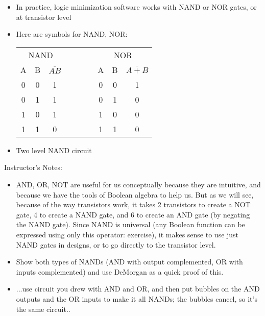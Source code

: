 \begin{frame}[fragile]
  \begin{itemize}
  \item In practice, logic minimization software works with
	NAND or NOR gates, or at transistor level

  \item Here are symbols for NAND, NOR:

	\begin{center}
	\begin{tabular}{|c|c|c|c|c|c|c|}\cline{1-3}\cline{5-7}
	\multicolumn{3}{|c|}{NAND}& &\multicolumn{3}{|c|}{NOR} \\\cline{1-3}\cline{5-7}
	A & B & \Large$\overline{AB}$ &~~~~~ & A & B & \Large$\overline{A+B}$  \\\cline{1-3}\cline{5-7}
	0 & 0 & 1   & & 0 & 0 & 1   \\\cline{1-3}\cline{5-7}
	0 & 1 & 1   & & 0 & 1 & 0   \\\cline{1-3}\cline{5-7}
	1 & 0 & 1   & & 1 & 0 & 0 \\\cline{1-3}\cline{5-7}
	1 & 1 & 0   & & 1 & 1 & 0 \\\cline{1-3}\cline{5-7}
	\end{tabular}
	\end{center}
    \item Two level NAND circuit
    \end{itemize}
\end{frame}
\BNotes\ifnum{}
\begin{frame}[fragile]
Instructor's Notes:
\begin{itemize}
\item
AND, OR, NOT are useful for us conceptually because they are
intuitive, and because we have the tools of Boolean algebra to help
us. But as we will see, because of the way transistors work, it takes 2
transistors to create a NOT gate, 4 to create a NAND gate, and 6 to
create an AND gate (by negating the NAND gate). Since NAND is
universal (any Boolean function can be expressed using only this
operator: exercise), it makes sense to use just NAND gates in designs,
or to go directly to the transistor level.

\item 	Show both types of NANDs (AND with output complemented, OR with
	inputs complemented) and use DeMorgan as a quick proof of this.
\item ...use circuit you drew with AND and OR, and then put bubbles on the
	AND outputs and the OR inputs to make it all NANDs; the bubbles
	cancel, so it's the same circuit..

\end{itemize}
\end{frame}
\fi\ENotes

